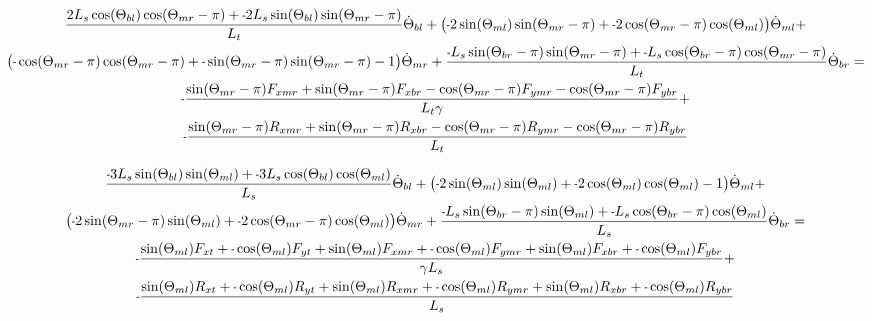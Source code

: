 \documentclass[11pt, landscape]{article}
\newcommand{\mn}{\scalebox{0.7}[1.0]{-}}
\begin{document}
\begin{multline}
\frac{2L_{s}\cos(\Theta_{bl})\cos(\Theta_{mr}-\pi) + \mn 2L_{s}\sin(\Theta_{bl})\sin(\Theta_{mr}-\pi)}{L_{t}}\dot{\Theta}_{bl} + 
\big(\mn 2\sin(\Theta_{ml})\sin(\Theta_{mr}-\pi) + \mn 2\cos(\Theta_{mr}-\pi)\cos(\Theta_{ml}) \big)\dot{\Theta}_{ml} + \\
\big( \mn \cos(\Theta_{mr}-\pi)\cos(\Theta_{mr}-\pi) + \mn\sin(\Theta_{mr}-\pi)\sin(\Theta_{mr}-\pi) - 1\big)\dot{\Theta}_{mr} + 
\frac{\mn L_{s}\sin(\Theta_{br}-\pi)\sin(\Theta_{mr}-\pi) + \mn L_{s}\cos(\Theta_{br}-\pi)\cos(\Theta_{mr}-\pi)}{L_{t}}\dot{\Theta}_{br} = \\
\mn\frac{\sin(\Theta_{mr}-\pi)F_{xmr} + \sin(\Theta_{mr}-\pi)F_{xbr} - \cos(\Theta_{mr}-\pi)F_{ymr} - \cos(\Theta_{mr}-\pi)F_{ybr}}{L_{t}\gamma} + \\
\mn\frac{\sin(\Theta_{mr}-\pi)R_{xmr} + \sin(\Theta_{mr}-\pi)R_{xbr} - \cos(\Theta_{mr}-\pi)R_{ymr} - \cos(\Theta_{mr}-\pi)R_{ybr}}{L_{t}}
\end{multline}



\begin{multline}
\frac{\mn 3L_{s}\sin(\Theta_{bl})\sin(\Theta_{ml}) + \mn3L_{s}\cos(\Theta_{bl})\cos(\Theta_{ml})}{L_s}\dot{\Theta}_{bl} + 
\big(\mn 2\sin(\Theta_{ml})\sin(\Theta_{ml}) + \mn 2\cos(\Theta_{ml})\cos(\Theta_{ml}) - 1\big)\dot{\Theta}_{ml} + \\
\big(\mn 2\sin(\Theta_{mr}-\pi)\sin(\Theta_{ml}) + \mn 2\cos(\Theta_{mr}-\pi)\cos(\Theta_{ml}) \big)\dot{\Theta}_{mr} + 
\frac{\mn L_{s}\sin(\Theta_{br}-\pi)\sin(\Theta_{ml}) + \mn L_{s}\cos(\Theta_{br}-\pi)\cos(\Theta_{ml})}{L_s}\dot{\Theta}_{br} = \\
\mn \frac{\sin(\Theta_{ml})F_{xt } + \mn \cos(\Theta_{ml})F_{yt } + \sin(\Theta_{ml})F_{xmr} + \mn \cos(\Theta_{ml})F_{ymr} + \sin(\Theta_{ml})F_{xbr} + \mn \cos(\Theta_{ml})F_{ybr}}{\gamma L_s} + \\
\mn \frac{\sin(\Theta_{ml})R_{xt } + \mn \cos(\Theta_{ml})R_{yt } + \sin(\Theta_{ml})R_{xmr} + \mn \cos(\Theta_{ml})R_{ymr} + \sin(\Theta_{ml})R_{xbr} + \mn \cos(\Theta_{ml})R_{ybr}}{L_s}
\end{multline}
\end{document}

